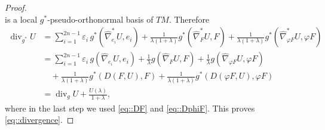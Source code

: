 \documentclass[12pt,a4paper,final]{amsart}
\numberwithin{equation}{section}
\theoremstyle{df}
\newcommand{\eps}{\varepsilon}
\begin{document}
\begin{proof}
$$$$
is a local $g^\ast$-pseudo-orthonormal basis of $TM$. Therefore
\begin{align*}
\operatorname{div}_{g^\ast}U
&=\sum_{i=1}^{2n-1}\eps_i\,g^\ast(\widehat{\nabla}^\ast_{e_i}U,e_i)
+\frac{1}{\lambda(1+\lambda)}g^\ast(\widehat{\nabla}^\ast_FU,F)
+\frac{1}{\lambda(1+\lambda)}g^\ast(\widehat{\nabla}^\ast_{\varphi F}U,\varphi F)\\
&=\sum_{i=1}^{2n-1}\eps_i\,g(\widehat{\nabla}_{e_i}U,e_i)
+\frac{1}{\lambda}g(\widehat{\nabla}_FU,F)
+\frac{1}{\lambda}g(\widehat{\nabla}_{\varphi F}U,\varphi F)\\
&\quad+\frac{1}{\lambda(1+\lambda)}g^\ast(D(F,U),F)
+\frac{1}{\lambda(1+\lambda)}g^\ast(D(\varphi F,U),\varphi F)\\
&=\operatorname{div}_gU+\frac{U(\lambda)}{1+\lambda},
\end{align*}
where in the last step we used \eqref{eq::DF} and \eqref{eq::DphiF}. This proves
\eqref{eq::divergence}.
\end{proof}
\end{document}
